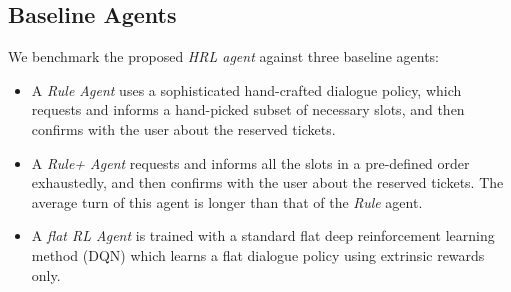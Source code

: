 \documentclass[11pt,letterpaper]{article}
\begin{document}
\subsection{Baseline Agents}
We benchmark the proposed \textit{HRL agent} against three baseline agents: 
\begin{itemize}
\item A \textit{Rule Agent} uses a sophisticated hand-crafted dialogue policy, which requests and informs a hand-picked subset of necessary slots, and then confirms with the user about the reserved tickets.
\item A \textit{Rule+ Agent} requests and informs all the slots in a pre-defined order exhaustedly, and then confirms with the user about the reserved tickets.  The average turn of this agent is longer than that of the \textit{Rule} agent.
\item A \textit{flat RL Agent} is trained with a standard flat deep reinforcement learning method (DQN) which learns a flat dialogue policy using extrinsic rewards only.
\end{itemize}
\end{document}
